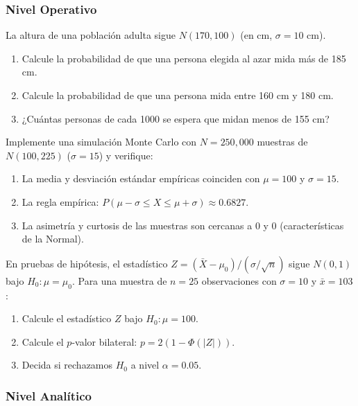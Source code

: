 \subsubsection*{Nivel Operativo}

\begin{problema}
	\label{prob:4.6.4}
	La altura de una población adulta sigue $N(170, 100)$ (en cm, $\sigma = 10$ cm).
	\begin{enumerate}
		\item Calcule la probabilidad de que una persona elegida al azar mida más de 185 cm.
		\item Calcule la probabilidad de que una persona mida entre 160 cm y 180 cm.
		\item ¿Cuántas personas de cada 1000 se espera que midan menos de 155 cm?
	\end{enumerate}
\end{problema}

\begin{problema}
	\label{prob:4.6.5}
	Implemente una simulación Monte Carlo con $N = 250{,}000$ muestras de $N(100, 225)$ ($\sigma = 15$) y verifique:
	\begin{enumerate}
		\item La media y desviación estándar empíricas coinciden con $\mu = 100$ y $\sigma = 15$.
		\item La regla empírica: $P(\mu - \sigma \le X \le \mu + \sigma) \approx 0.6827$.
		\item La asimetría y curtosis de las muestras son cercanas a 0 y 0 (características de la Normal).
	\end{enumerate}
\end{problema}

\begin{problema}
	\label{prob:4.6.6}
	En pruebas de hipótesis, el estadístico $Z = (\bar{X} - \mu_{0})/(\sigma/\sqrt{n})$ sigue $N(0, 1)$ bajo $H_{0}: \mu = \mu_{0}$. Para una muestra de $n = 25$ observaciones con $\sigma = 10$ y $\bar{x} = 103$:
	\begin{enumerate}
		\item Calcule el estadístico $Z$ bajo $H_{0}: \mu = 100$.
		\item Calcule el $p$-valor bilateral: $p = 2(1 - \Phi(|Z|))$.
		\item Decida si rechazamos $H_{0}$ a nivel $\alpha = 0.05$.
	\end{enumerate}
\end{problema}

\subsubsection*{Nivel Analítico}

